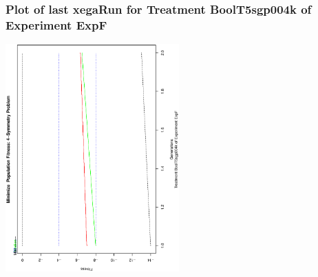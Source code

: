  \begin{frame}
 \frametitle{ Plot of last xegaRun for Treatment BoolT5sgp004k of Experiment ExpF }
 \begin{center}
\includegraphics[width=0.5\textwidth, angle=-90]
{ExpFPlotPopStatsFigure002.eps}
 \end{center}
 \label{templateReport/ExpFPlotPopStatsFigure002.eps}  
 \end{frame}


